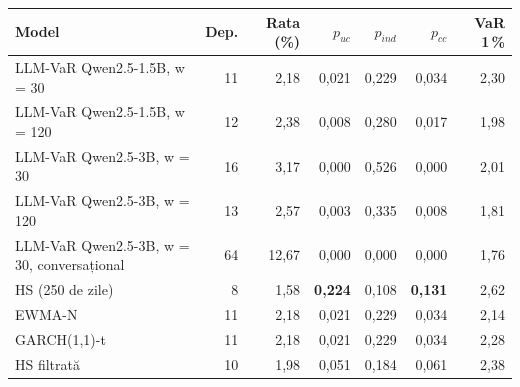 \begin{tabular}{lrrrrrr}
\toprule
Model & Dep. & Rata (\%) & $p_{uc}$ & $p_{ind}$ & $p_{cc}$ & VaR 1\,\% \\
\midrule
LLM-VaR Qwen2.5-1.5B, w = 30 & 11 & 2,18 & 0,021 & 0,229 & 0,034 & 2,30 \\
LLM-VaR Qwen2.5-1.5B, w = 120 & 12 & 2,38 & 0,008 & 0,280 & 0,017 & 1,98 \\
LLM-VaR Qwen2.5-3B, w = 30 & 16 & 3,17 & 0,000 & 0,526 & 0,000 & 2,01 \\
LLM-VaR Qwen2.5-3B, w = 120 & 13 & 2,57 & 0,003 & 0,335 & 0,008 & 1,81 \\
LLM-VaR Qwen2.5-3B, w = 30, conversațional & 64 & 12,67 & 0,000 & 0,000 & 0,000 & 1,76 \\
HS (250 de zile) & 8 & 1,58 & \textbf{0,224} & 0,108 & \textbf{0,131} & 2,62 \\
EWMA-N & 11 & 2,18 & 0,021 & 0,229 & 0,034 & 2,14 \\
GARCH(1,1)-t & 11 & 2,18 & 0,021 & 0,229 & 0,034 & 2,28 \\
HS filtrată & 10 & 1,98 & 0,051 & 0,184 & 0,061 & 2,38 \\
\bottomrule
\end{tabular}
